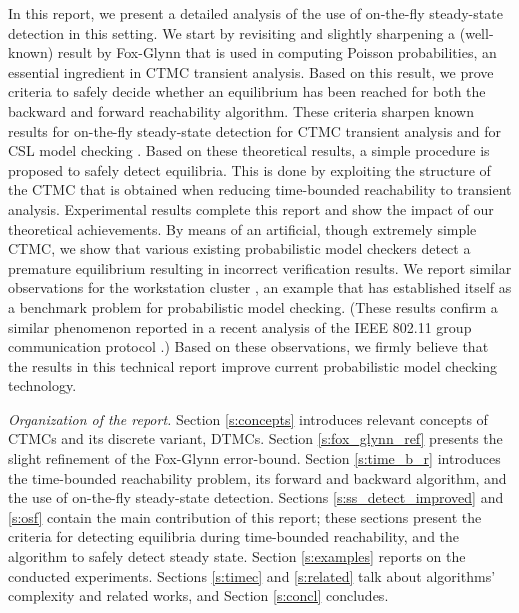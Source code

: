 \documentclass[a4paper,11pt]{article}
\begin{document}
In this report, we present a detailed analysis of the use of on-the-fly steady-state detection in this
setting. 
We start by revisiting and slightly sharpening a (well-known) result by Fox-Glynn \cite{FoxG_ACM88} that is used in computing Poisson probabilities, an essential ingredient in CTMC transient analysis.
Based on this result, we prove criteria to safely decide whether an equilibrium has been reached 
for both the backward and forward reachability algorithm. 
These criteria sharpen known results for on-the-fly steady-state detection for CTMC transient 
analysis \cite{MalhotraMT_MR94} and for CSL model checking \cite{YounesKNP_TACAS04,%
YounesKNP_STTT05}.
Based on these theoretical results, a simple procedure is proposed to safely detect equilibria.
This is done by exploiting the structure of the CTMC that is obtained when reducing time-bounded reachability to transient analysis. 
Experimental results complete this report and show the impact of our theoretical achievements. 
By means of an artificial, though extremely simple CTMC, we show that various existing
probabilistic model checkers detect a premature equilibrium resulting in incorrect verification
results.
We report similar observations for the workstation cluster \cite{HaverkortHK_SRDS00, BuchholzKKT_JLAP03, YounesKNP_TACAS04, KwiatkowskaNP_IMTTCPE02, Prism_WC05}, 
an example that has established itself as a benchmark problem for probabilistic model checking.
(These results confirm a similar phenomenon reported in a recent analysis of the IEEE 802.11 
group communication protocol \cite{MassinkKL_DSN04}.)
Based on these observations, we firmly believe that the results in this technical report improve current
probabilistic model checking technology.

\emph{Organization of the report.} 
Section \ref{s:concepts} introduces relevant concepts of CTMCs and its discrete variant, DTMCs. 
Section \ref{s:fox_glynn_ref} presents the slight refinement of the Fox-Glynn error-bound. 
Section \ref{s:time_b_r} introduces the time-bounded reachability problem, its forward and
backward algorithm, and the use of on-the-fly steady-state detection. 
Sections \ref{s:ss_detect_improved} and \ref{s:osf} contain the main contribution of this report;
these sections present the criteria for detecting equilibria during time-bounded reachability,
and the algorithm to safely detect steady state.    
Section \ref{s:examples} reports on the conducted experiments. Sections \ref{s:timec} and \ref{s:related} talk about algorithms' complexity and related works, and Section \ref{s:concl} concludes.
\end{document}
